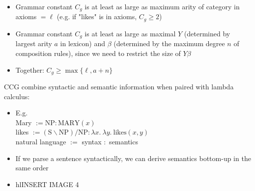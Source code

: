 \begin{itemize}
\begin{itemize}
\begin{itemize}
\begin{itemize}
            \end{itemize}
        \end{itemize}
    \end{itemize}
    \item Grammar constant $C_g$ is at least as large as maximum arity of category in axioms $= \ell$ (e.g. if "likes" is in axioms, $C_g $)
    \item Grammar constant $C_g$ is at least as large as maximal $Y$ (determined by largest arity $a$ in lexicon) and $\beta$ (determined by the maximum degree $n$ of composition rules), since we need to restrict the size of $Y \beta$
    \item Together: $C_g \geq \max \{ \ell, a + n \}$
\end{itemize}
CCG combine syntactic and semantic information when paired with lambda calculus:
\begin{itemize}
    \item E.g.\\
    Mary $:= \textrm{NP} : \textrm{MARY}(x)$\\
    likes $:= (\textrm{S} \backslash \textrm{NP}) / \textrm{NP} : \lambda x.\ \lambda y.\ \textrm{likes}(x, y)$\\
    natural language $:=$ syntax $:$ semantics
    \item If we parse a sentence syntactically, we can derive semantics bottom-up in the same order
    \item hl{INSERT IMAGE 4}
\end{itemize}